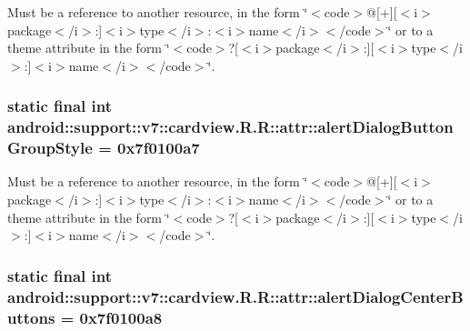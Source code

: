 Must be a reference to another resource, in the form \char`\"{}$<$code$>$@\mbox{[}+\mbox{]}\mbox{[}$<$i$>$package$<$/i$>$:\mbox{]}$<$i$>$type$<$/i$>$:$<$i$>$name$<$/i$>$$<$/code$>$\char`\"{} or to a theme attribute in the form \char`\"{}$<$code$>$?\mbox{[}$<$i$>$package$<$/i$>$:\mbox{]}\mbox{[}$<$i$>$type$<$/i$>$:\mbox{]}$<$i$>$name$<$/i$>$$<$/code$>$\char`\"{}. \hypertarget{classandroid_1_1support_1_1v7_1_1cardview_1_1_r_1_1attr_bc51817f533dff2862e6e50d772b8d42}{
\subsubsection[{alertDialogButtonGroupStyle}]{\setlength{\rightskip}{0pt plus 5cm}static final int android::support::v7::cardview.R.R::attr::alertDialogButtonGroupStyle = 0x7f0100a7}}
\label{classandroid_1_1support_1_1v7_1_1cardview_1_1_r_1_1attr_bc51817f533dff2862e6e50d772b8d42}


Must be a reference to another resource, in the form \char`\"{}$<$code$>$@\mbox{[}+\mbox{]}\mbox{[}$<$i$>$package$<$/i$>$:\mbox{]}$<$i$>$type$<$/i$>$:$<$i$>$name$<$/i$>$$<$/code$>$\char`\"{} or to a theme attribute in the form \char`\"{}$<$code$>$?\mbox{[}$<$i$>$package$<$/i$>$:\mbox{]}\mbox{[}$<$i$>$type$<$/i$>$:\mbox{]}$<$i$>$name$<$/i$>$$<$/code$>$\char`\"{}. \hypertarget{classandroid_1_1support_1_1v7_1_1cardview_1_1_r_1_1attr_b0136fcf555107b50e46274bc49fa51c}{
\subsubsection[{alertDialogCenterButtons}]{\setlength{\rightskip}{0pt plus 5cm}static final int android::support::v7::cardview.R.R::attr::alertDialogCenterButtons = 0x7f0100a8}}
\label{classandroid_1_1support_1_1v7_1_1cardview_1_1_r_1_1attr_b0136fcf555107b50e46274bc49fa51c}


